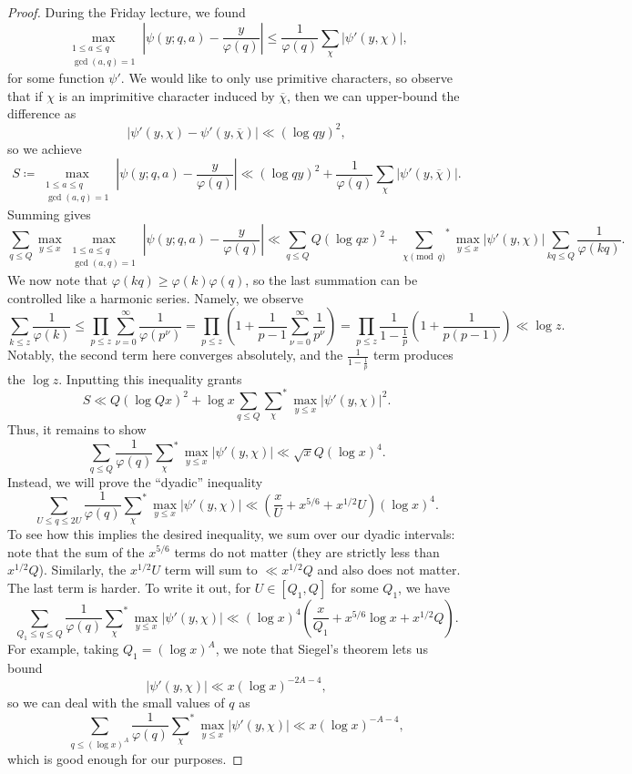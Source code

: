 \documentclass[../notes.tex]{subfiles}
\begin{document}
\begin{proof}
	During the Friday lecture, we found
	\[\max_{\substack{1\le a\le q\\\gcd(a,q)=1}}\left|\psi(y;q,a)-\frac y{\varphi(q)}\right|\le\frac1{\varphi(q)}\sum_\chi|\psi'(y,\chi)|,\]
	for some function $\psi'$. We would like to only use primitive characters, so observe that if $\chi$ is an imprimitive character induced by $\overline\chi$, then we can upper-bound the difference as
	\[|\psi'(y,\chi)-\psi'(y,\overline\chi)|\ll(\log qy)^2,\]
	so we achieve
	\[S\coloneqq\max_{\substack{1\le a\le q\\\gcd(a,q)=1}}\left|\psi(y;q,a)-\frac y{\varphi(q)}\right|\ll(\log qy)^2+\frac1{\varphi(q)}\sum_\chi|\psi'(y,\overline\chi)|.\]
	Summing gives
	\[\sum_{q\le Q}\max_{y\le x}\max_{\substack{1\le a\le q\\\gcd(a,q)=1}}\left|\psi(y;q,a)-\frac y{\varphi(q)}\right|\ll\sum_{q\le Q} Q(\log qx)^2+{\sum_{\chi\pmod q}}^*\max_{y\le x}|\psi'(y,\chi)|\sum_{kq\le Q}\frac1{\varphi(kq)}.\]
	We now note that $\varphi(kq)\ge\varphi(k)\varphi(q)$, so the last summation can be controlled like a harmonic series. Namely, we observe
	\[\sum_{k\le z}\frac1{\varphi(k)}\le\prod_{p\le z}\sum_{\nu=0}^\infty\frac1{\varphi(p^\nu)}=\prod_{p\le z}\left(1+\frac1{p-1}\sum_{\nu=0}^\infty\frac1{p^\nu}\right)=\prod_{p\le z}\frac1{1-\frac1p}\left(1+\frac1{p(p-1)}\right)\ll\log z.\]
	Notably, the second term here converges absolutely, and the $\frac1{1-\frac1p}$ term produces the $\log z$. Inputting this inequality grants
	\[S\ll Q(\log Qx)^2+\log x\sum_{q\le Q}{\sum_\chi}^*\max_{y\le x}|\psi'(y,\chi)|^2.\]
	Thus, it remains to show
	\[\sum_{q\le Q}\frac1{\varphi(q)}{\sum_\chi}^*\max_{y\le x}|\psi'(y,\chi)|\ll\sqrt xQ(\log x)^4.\]
	Instead, we will prove the ``dyadic'' inequality
	\[\sum_{U\le q\le 2U}\frac1{\varphi(q)}{\sum_\chi}^*\max_{y\le x}|\psi'(y,\chi)|\ll\left(\frac xU+x^{5/6}+x^{1/2}U\right)(\log x)^4.\]
	To see how this implies the desired inequality, we sum over our dyadic intervals: note that the sum of the $x^{5/6}$ terms do not matter (they are strictly less than $x^{1/2}Q$). Similarly, the $x^{1/2}U$ term will sum to $\ll x^{1/2}Q$ and also does not matter. The last term is harder. To write it out, for $U\in[Q_1,Q]$ for some $Q_1$, we have
	\[\sum_{Q_1\le q\le Q}\frac1{\varphi(q)}{\sum_\chi}^*\max_{y\le x}|\psi'(y,\chi)|\ll(\log x)^4\left(\frac x{Q_1}+x^{5/6}\log x+x^{1/2}Q\right).\]
	For example, taking $Q_1=(\log x)^A$, we note that Siegel's theorem lets us bound
	\[|\psi'(y,\chi)|\ll x(\log x)^{-2A-4},\]
	so we can deal with the small values of $q$ as
	\[\sum_{q\le(\log x)^A}\frac1{\varphi(q)}{\sum_\chi}^*\max_{y\le x}|\psi'(y,\chi)|\ll x(\log x)^{-A-4},\]
	which is good enough for our purposes.


\end{proof}
\end{document}

